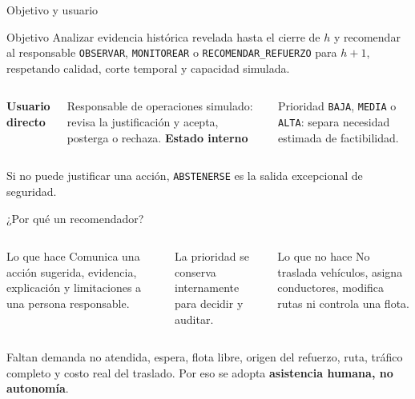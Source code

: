 \documentclass[aspectratio=169,11pt]{beamer}
\newcommand{\concepto}[1]{\textcolor{UAPTeal}{\textbf{#1}}}
\newcommand{\accion}[1]{\texttt{#1}}
\begin{document}
\begin{frame}{Objetivo y usuario}
  \begin{block}{Objetivo}
    Analizar evidencia histórica revelada hasta el cierre de $h$ y recomendar al responsable \accion{OBSERVAR}, \accion{MONITOREAR} o \accion{RECOMENDAR\_REFUERZO} para $h+1$, respetando calidad, corte temporal y capacidad simulada.
  \end{block}
  \begin{columns}[T]
      \concepto{Usuario directo}\par
      Responsable de operaciones simulado: revisa la justificación y acepta, posterga o rechaza.
      \concepto{Estado interno}\par
      Prioridad \accion{BAJA}, \accion{MEDIA} o \accion{ALTA}: separa necesidad estimada de factibilidad.
  \end{columns}
  \vfill
  \alert{Si no puede justificar una acción, \accion{ABSTENERSE} es la salida excepcional de seguridad.}
\end{frame}

\begin{frame}{¿Por qué un recomendador?}
  \begin{columns}[c]
      \begin{block}{Lo que hace}
        Comunica una acción sugerida, evidencia, explicación y limitaciones a una persona responsable.
      \end{block}
      La prioridad se conserva internamente para decidir y auditar.
      \begin{alertblock}{Lo que no hace}
        No traslada vehículos, asigna conductores, modifica rutas ni controla una flota.
      \end{alertblock}
  \end{columns}
  \vfill
  Faltan demanda no atendida, espera, flota libre, origen del refuerzo, ruta, tráfico completo y costo real del traslado. Por eso se adopta \concepto{asistencia humana, no autonomía}.
\end{frame}
\end{document}
